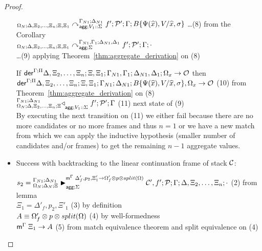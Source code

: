 \begin{proof}
\begin{itemize}[leftmargin=*]
      $\derstatea{\Delta, \Xi_2, \dotsc, \Xi_n}{\Xi,
         \Xi_1}{\Gamma_{N1}}{\Delta_{N1}}{V_1 :: \Sigma}{f';
            \lstack{P'}}{B\{\Psi(\widehat{x}), V / \widehat{x}, \sigma\}}$
      \dots \hfill (8) from the Corollary \\

      $\derstatea{\Delta, \Xi_2, \dotsc, \Xi_n}{\Xi, \Xi_1}{\Gamma_{N1},
         \Gamma_1}{\Delta_{N1}, \Delta_1}{\Sigma}{f'; \lstack{P'}}{\cdot}$
      \\ \dots \hfill (9) applying Theorem~\ref{thm:aggregate_derivation} on (8)

      If $\dz{\Gamma}{\Pi}{\Delta, \Xi_2, \dotsc, \Xi_n}{\Xi, \Xi_1}{\Gamma_{N1},
         \Gamma_1}{\Delta_{N1}, \Delta_1}{\Omega_x}{\outsem}$ then \\
         \hspace{2cm}
         $\dz{\Gamma}{\Pi}{\Delta, \Xi_2, \dotsc,
            \Xi_n}{\Xi, \Xi_1}{\Gamma_{N1}}{\Delta_{N1}}{B\{\Psi(\widehat{x}), V
               / \widehat{x}, \sigma\}, \Omega_x}{\outsem}$
            \hfill (10) from
      Theorem~\ref{thm:aggregate_derivation} on (8) \\

      $\contstatea{\Delta, \Xi_2, \dotsc, \Xi_n}{f' ; \lstack{P'}}{\Gamma}{V_1
         :: \Sigma}$ \hfill (11) next state of (9) \\

      By executing the next transition on (11) we either fail because there are
      no more candidates or no more frames and thus $n = 1$ or we have a new
      match from which we can apply the inductive hypothesis (smaller number of
      candidates and/or frames) to get the remaining $n - 1$ aggregate
      values.
      
   \item Success with backtracking to the linear continuation frame of stack $\lstack{C}$:
      
      $s_2 = \matstatea{\Delta_N}{\lstack{C'},
         f';\lstack{P}}{\Gamma}{\Delta, \Xi_2, \dotsc, \Xi_n}{\cdot}{\Delta'_f, p_2, \Xi'_1 \rightarrow \Omega'_f \otimes p
                  \otimes split(\Omega)}{\Sigma}$ \hfill (2) from lemma \\

      $\Xi_1 = \Delta'_f, p_2, \Xi'_1$ \hfill (3) by definition \\

      $\feq{A}{\Omega'_f \otimes p \otimes split(\Omega)}$ \hfill (4) by
      well-formedness \\
      $\mz{\Gamma}{\Xi_1}{A}$ \hfill (5) from match equivalence
      theorem and split equivalence on (4) \\


\end{itemize}
\end{proof}
